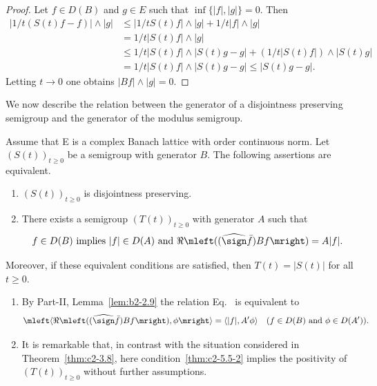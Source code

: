 \begin{proof}
Let $f \in D(B)$ and $g \in E$ such that $\inf\{|f|,|g|\} = 0$. 
Then
\begin{align*}
|1/t(S(t)f - f)| \wedge |g| &\leq |1/tS(t)f| \wedge |g| + 1/t|f| \wedge |g|\\
&= 1/t |S(t)f| \wedge |g|\\
&\leq 1/t |S(t)f| \wedge |S(t)g -g| + (1/t|S(t)f|) \wedge |S(t)g|\\
&= 1/t |S(t)f| \wedge |S(t)g - g|
\leq |S(t)g - g|.
\end{align*}
Letting $t \to 0$ one obtains $|Bf| \wedge |g| = 0$. %
\end{proof}
We now describe the relation between the generator of a disjointness preserving semigroup and the generator of the modulus semigroup.
\begin{theorem}\label{thm:c2-5.5}
Assume that E is a complex Banach lattice with order continuous norm. 
Let $(S(t))_{t \geq 0}$ be a semigroup with generator $B$.
The following assertions are equivalent.
\begin{enumerate}[\upshape (a)]
\item \label{thm:c2-5.5-1}
$(S(t))_{t \geq 0}$ is disjointness preserving.
\item \label{thm:c2-5.5-2}
There exists a semigroup $(T(t))_{t \geq 0}$ with generator $A$ such
that
\begin{equation}\label{eq:c2-5.5}
f \in D(B) \text{ implies } |f| \in D(A) \text{ and } \Re\mleft((\widehat{\sign}  \bar{f})Bf\mright) = A|f|.
\end{equation}
\end{enumerate}
Moreover, if these equivalent conditions are satisfied, then
$T(t) = |S(t)|$ for all $t \geq 0$.
\end{theorem}
\begin{remark*} 
\begin{enumerate}[\upshape (i), wide, labelindent=.25em] %
\item  \label{enum:c2-kgk.1-1} %
By Part-II, Lemma~\ref{lem:b2-2.9} the relation Eq.~ is equivalent to
\[
\mleft\langle\Re\mleft(( \widehat{\sign}  \bar{f})Bf\mright),\phi \mright\rangle = \langle|f|,A'\phi\rangle \quad (f \in D(B) \text { and }  \phi \in D(A')).
\]
\item \label{enum:c2-kgk.1-2}
It is remarkable that, in contrast with the situation considered in
Theorem~\ref{thm:c2-3.8}, here condition~\ref{thm:c2-5.5-2}  implies the positivity of\/ $(T(t))_{t \geq 0}$
without further assumptions.
\end{enumerate}
\end{remark*}
